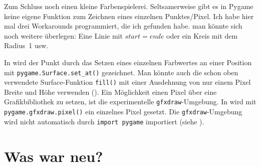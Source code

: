 Zum Schluss noch einen kleine Farbenspielerei. Seltsamerweise gibt es in Pygame keine eigene Funktion zum Zeichnen eines einzelnen Punktes/Pixel. Ich habe hier mal drei Workarounds programmiert, die ich gefunden habe. man könnte sich noch weitere überlegen: Eine Linie mit $start=ende$ oder ein Kreis mit dem Radius~1 usw.

In  wird der Punkt durch das Setzen eines einzelnen Farbwertes an einer Position mit \texttt{pygame.Surface.set\_at()} gezeichnet. Man könnte auch die schon oben verwendete Surface-Funktion \texttt{fill()} mit einer Ausdehnung von nur einem Pixel Breite und Höhe verwenden (). Ein Möglichkeit einen Pixel über eine Grafikbibliothek zu setzen, ist die experimentelle \texttt{gfxdraw}-Umgebung. In  wird mit \texttt{pygame.gfxdraw.pixel()} ein einzelnes Pixel gesetzt. Die \texttt{gfxdraw}-Umgebung wird nicht automatisch durch \texttt{import pygame} importiert (siehe ).

\section{Was war neu?}


